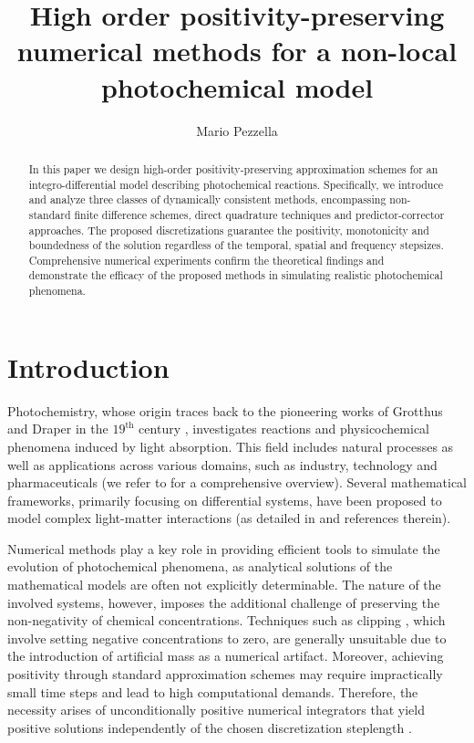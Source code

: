 \documentclass[a4paper, UKenglish, numberwithinsect, thm-restate]{tgdk-v2021}
\title{High order positivity-preserving numerical methods for a non-local photochemical model} %
\author{Mario Pezzella}{National Research Council of Italy, Institute for Applied Mathematics ``Mauro Picone'', Via P. Castellino, 111 - 80131 Naples, Italy \and Member of the Italian National Group for Scientific Computing GNCS of the National Institute for Advanced Mathematics INdAM}{mario.pezzella@cnr.it}{https://orcid.org/0000-0002-1869-945X}{}%
\begin{document}
\maketitle

\begin{abstract}
In this paper we design high-order positivity-preserving approximation schemes for an integro-differential model describing photochemical reactions. Specifically, we introduce and analyze three classes of dynamically consistent methods, encompassing non-standard finite difference schemes, direct quadrature techniques and predictor-corrector approaches. The proposed discretizations guarantee the positivity, monotonicity and boundedness of the solution regardless of the temporal, spatial and frequency stepsizes. Comprehensive numerical experiments confirm the theoretical findings and demonstrate the efficacy of the proposed methods in simulating realistic photochemical phenomena.
\end{abstract}

\section{Introduction}\label{sec:Intro}

Photochemistry, whose origin traces back to the pioneering works of Grotthus and Draper in the $\text{19}^{\text{th}}$ century \cite{Persico_2018}, investigates reactions and physicochemical phenomena induced by light absorption. This field includes natural processes as well as applications across various domains, such as industry, technology and pharmaceuticals (we refer to \cite{rohatgi1978fundamentals,tonnesen1996photostability} for a comprehensive overview). Several mathematical frameworks, primarily focusing on differential systems, have been proposed to model complex light-matter interactions (as detailed in \cite{Baranov2014,Photochemical_MAth_1,Photochemical_MAth_4,Ceseri_Natalini_Pezzella,Photochemical_MAth_3,MAAFI20163537,Photochemical_MAth_2} and references therein).

Numerical methods play a key role in providing efficient tools to simulate the evolution of photochemical phenomena, as analytical solutions of the mathematical models are often not explicitly determinable. The nature of the involved systems, however, imposes the additional challenge of preserving the non-negativity of chemical concentrations.  Techniques such as clipping \cite{SANDU2001589}, which involve setting negative concentrations to zero, are generally unsuitable due to the introduction of artificial mass as a numerical artifact. Moreover, achieving positivity through standard approximation schemes may require impractically small time steps and lead to high computational demands. Therefore, the necessity arises of unconditionally positive numerical integrators that yield positive solutions independently of the chosen discretization steplength \cite{Blanes,Formaggia_Scotti,SCALONE2022351,Zhang2024-br}.  
\end{document}

